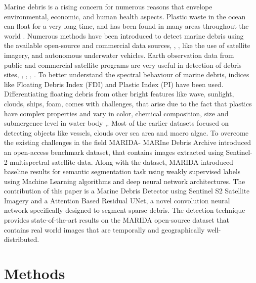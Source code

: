 \documentclass[review]{elsarticle}
\begin{document}
Marine debris is a rising concern for numerous reasons that envelope environmental, economic, and human health aspects. Plastic waste in the ocean can float for a very long time, and has been found in many areas throughout the world \cite{S_Punla2022-nr}\cite{George2019-kk}. Numerous methods have been introduced to detect marine debris using the available open-source and commercial data sources\cite{Maximenko2019}, \cite{Hu2021}, \cite{ValdenegroToro2016}, like the use of satellite imagery\cite{Hu2021}, and autonomous underwater vehicles\cite{ValdenegroToro2016}.
Earth observation data from public and commercial satellite programs are very useful in detection of debris sites\cite{Topouzelis2019}, \cite{Kikaki2020}, \cite{Kremezi2021}, \cite{AcuaRuz2018}, \cite{Biermann2020}. To better understand the spectral behaviour of marine debris, indices like Floating Debris Index (FDI)\cite{Themistocleous2020} and Plastic Index (PI)\cite{Biermann2020} have been used.  Differentiating floating debris from other bright features like wave, sunlight, clouds, ships, foam, comes with challenges\cite{Garaba2018},\cite{Dierssen2020} that arise due to the fact that plastics have complex properties and vary in color, chemical composition, size and submergence level in water body \cite{Kikaki2020},\cite{Topouzelis2019}. 
Most of the earlier datasets focused on detecting objects like vessels\cite{Heiselberg2017}, clouds over sea area\cite{Kristollari2020} and macro algae\cite{Wang2021}. To overcome the existing challenges in the field MARIDA- MARIne Debris Archive\cite{10.1371/journal.pone.0262247} introduced an open-access benchmark dataset, that contains images extracted using Sentinel-2 multispectral satellite data. Along with the dataset, MARIDA introduced baseline results for semantic segmentation task using weakly supervised labels using Machine Learning algorithms and deep neural network architectures.
The contribution of this paper is a Marine Debris Detector using Sentinel S2 Satellite Imagery and a Attention Based Residual UNet, a novel convolution neural network specifically designed to segment sparse debris. The detection technique provides state-of-the-art results on the MARIDA open-source dataset that contains real world images that are temporally and geographically well-distributed.

\section{Methods}
\end{document}
